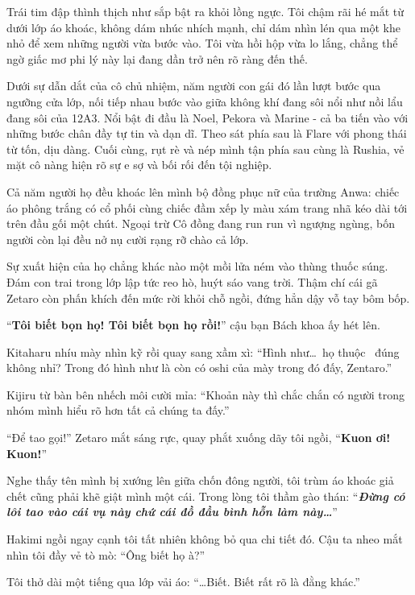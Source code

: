 \documentclass[../main.tex]{subfiles}
\begin{document}
Trái tim đập thình thịch như sắp bật ra khỏi lồng ngực. Tôi chậm rãi hé mắt từ dưới lớp áo khoác, không dám nhúc nhích mạnh, chỉ dám nhìn lén qua một khe nhỏ để xem những người vừa bước vào. Tôi vừa hồi hộp vừa lo lắng, chẳng thể ngờ giấc mơ phi lý này lại đang dần trở nên rõ ràng đến thế.


Dưới sự dẫn dắt của cô chủ nhiệm, năm người con gái đó lần lượt bước qua ngưỡng cửa lớp, nối tiếp nhau bước vào giữa không khí đang sôi nổi như nồi lẩu đang sôi của 12A3. Nổi bật đi đầu là Noel, Pekora và Marine - cả ba tiến vào với những bước chân đầy tự tin và dạn dĩ. Theo sát phía sau là Flare với phong thái từ tốn, dịu dàng. Cuối cùng, rụt rè và nép mình tận phía sau cùng là Rushia, vẻ mặt cô nàng hiện rõ sự e sợ và bối rối đến tội nghiệp.

Cả năm người họ đều khoác lên mình bộ đồng phục nữ của trường Anwa: chiếc áo phông trắng có cổ phối cùng chiếc đầm xếp ly màu xám trang nhã kéo dài tới trên đầu gối một chút. Ngoại trừ Cô đồng đang run run vì ngượng ngùng, bốn người còn lại đều nở nụ cười rạng rỡ chào cả lớp.

Sự xuất hiện của họ chẳng khác nào một mồi lửa ném vào thùng thuốc súng. Đám con trai trong lớp lập tức reo hò, huýt sáo vang trời. Thậm chí cái gã Zetaro còn phấn khích đến mức rời khỏi chỗ ngồi, đứng hẳn dậy vỗ tay bôm bốp.

``\textbf{Tôi biết bọn họ! Tôi biết bọn họ rồi!}'' cậu bạn Bách khoa ấy hét lên.

Kitaharu nhíu mày nhìn kỹ rồi quay sang xầm xì: ``Hình như\dots\ họ thuộc \hll\ đúng không nhỉ? Trong đó hình như là còn có oshi của mày trong đó đấy, Zentaro.''

Kijiru từ bàn bên nhếch môi cười mỉa: ``Khoản này thì chắc chắn có người trong nhóm mình hiểu rõ hơn tất cả chúng ta đấy.''

``Để tao gọi!'' Zetaro mắt sáng rực, quay phắt xuống dãy tôi ngồi, ``\textbf{Kuon ơi! Kuon!}''

Nghe thấy tên mình bị xướng lên giữa chốn đông người, tôi trùm áo khoác giả chết cũng phải khẽ giật mình một cái. Trong lòng tôi thầm gào thán: ``\textbf{\textit{Đừng có lôi tao vào cái vụ này chứ cái đồ đầu bình hỗn làm này\dots}}''

Hakimi ngồi ngay cạnh tôi tất nhiên không bỏ qua chi tiết đó. Cậu ta nheo mắt nhìn tôi đầy vẻ tò mò: ``Ông biết họ à?''

Tôi thở dài một tiếng qua lớp vải áo: ``\dots Biết. Biết rất rõ là đằng khác.''
\end{document}
